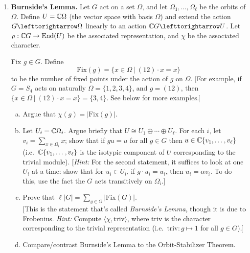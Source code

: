 \documentclass[11pt, reqno]{amsart}
\theoremstyle{plain}
\theoremstyle{definition}
\theoremstyle{example}
\def\<{\langle} \def\>{\rangle}
\def\End{\mathrm{End}}
\def\acts{\lefttorightarrow}
\def\Fix{\mathrm{Fix}}
\def\triv{\mathrm{triv}}
\begin{document}
\begin{enumerate}[I ]
\begin{enumerate}[1.]
\item \textbf{Burnside's Lemma.}\label{permutation action} Let $G$ act on a set $\Omega$, and let $\Omega_1, \dots, \Omega_\ell$ be the orbits of $\Omega$. Define $U = \mathbb{C} \Omega$ (the vector space with basis $\Omega$) and extend the action $G \acts \Omega$ linearly to an action $\CC G \acts U$. Let $\rho: \CC G \to \End(U)$ be the associated representation, and $\chi$ be the associated character. 

Fix $g \in G$. Define 
$$\Fix(g) = \{ x \in \Omega ~|~ (12) \cdot x = x\} $$
to be the number of fixed points under the action of $g$ on $\Omega$.  {[For example, if $G = S_4$ acts on naturally $\Omega = \{1,2,3, 4\}$, and $g = (12)$, then $\{ x \in \Omega ~|~ (12) \cdot x = x\} = \{3, 4\}$. See below for more examples.]} 
\begin{enumerate}[(a)]
\item Argue that $\chi(g) = |\Fix(g)|$.
\item Let $U_i = \mathbb{C} \Omega_i$. Argue briefly that $U \cong U_1 \oplus \cdots \oplus U_\ell$. For each $i$, let $v_i = \sum_{x \in \Omega_i} x$; show that if $gu = u$ for all $g \in G$ then $u \in \mathbb{C}\{v_1, \dots, v_\ell\}$ (i.e.\ $\mathbb{C}\{v_1, \dots, v_\ell\}$ is the isotypic component of $U$ corresponding to the trivial module). 
{[\emph{Hint:} For the second statement, it suffices to look at one $U_i$ at a time: show that for $u_i \in U_i$,  if $g \cdot u_i = u_i$, then $u_i = \alpha v_i$. To do this, use the fact the $G$ acts transitively on $\Omega_i$.]}
\item Prove that $\ell|G| = \sum_{g \in G} |\Fix(G)|$.\\
{[This is the statement that's called \emph{Burnside's Lemma}, though it is due to Frobenius. \emph{Hint:} Compute $\<\chi, \triv\>$, where $\triv$ is the character corresponding to the trivial representation (i.e.\ $\triv: g \mapsto 1$ for all $g \in G$).]} 
\item Compare/contrast Burnside's Lemma to the Orbit-Stabilizer Theorem.
\end{enumerate}
\end{enumerate}
\end{enumerate}

\vfill
\pagebreak
\end{document}
